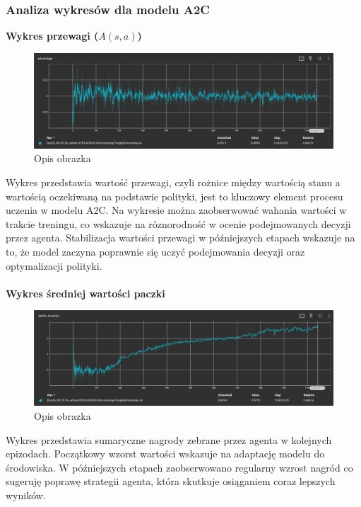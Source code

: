 \documentclass[a4paper, 12pt]{article}
\begin{document}
    \subsubsection{Analiza wykresów dla modelu A2C} 
    \noindent \textbf{Wykres przewagi (\( A(s,a) \))} 
    \begin{figure}[H]
        \centering
        \includegraphics[width=\textwidth]{pictures/A2C_advantage.png}
        \caption{Opis obrazka}
    \end{figure}
    Wykres przedstawia wartość przewagi, czyli rożnice między wartością stanu a wartością oczekiwaną na podstawie polityki, jest to kluczowy element procesu uczenia w modelu A2C.
    Na wykresie można zaobserwować wahania wartości w trakcie treningu, co wskazuje na róznorodność w ocenie podejmowanych decyzji przez agenta.
    Stabilizacja wartości przewagi w późniejszych etapach wskazuje na to, że model zaczyna poprawnie się uczyć podejmowania decyzji oraz optymalizacji polityki.
    \\ \\ 
    \textbf{Wykres średniej wartości paczki}
    \begin{figure}[H]
        \centering
        \includegraphics[width=\textwidth]{pictures/A2C_batch_rewards.png}
        \caption{Opis obrazka}
    \end{figure}
    Wykres przedstawia sumaryczne nagrody zebrane przez agenta w kolejnych epizodach.
    Początkowy wzorst wartości wskazuje na adaptację modelu do środowiska.
    W późniejszych etapach zaobserwowano regularny wzrost nagród co sugeruję poprawę strategii agenta, która skutkuje osiąganiem coraz lepszych wyników.
    \\ \\ 
\end{document}
